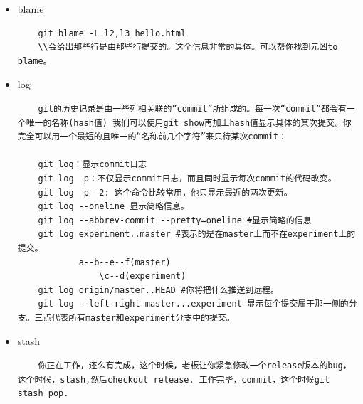 \documentclass[a4paper,12pt,twoside]{book}
\begin{document}
\begin{CJK*}{UTF8}{song}
\begin{itemize}
\begin{verbatim}
    ^ commit对象的第一个父母
    HEAD^^：表示HEAD父母的父母的信息
    HEAD^1：表示HEAD的第一个父母的信息
    HEAD^2：表示HEAD的第二个父母的信息

    ~n commit对象的上溯n代的父母
    HEAD~4：表示HEAD上溯四代的信息，~加数字。

    HEAD:README.txt 代表一个blob对象了。(blob对象的sh-hash值一般看不到，也不方便引用)

    :/fix a bug #代表在commit message 中查找fix a bug有这个串的第一个commit

    @{date specification}
    HEAD@{yesterday}

    git log 后面跟随一个命令集，命名一个集合可以采用一些简写。
    1)B...C #the set of commits that are reachable from either one of r1 or r2 but not from both.
    2)^G D #D的所有父母（包括D），但是不包括G的这个分支。
    3)D F #D,F的所有父母（包括D,F）
    4)C^@ #C的所有父母（不包括C）
    5)
    详细的信息，可以进一步参考gitrevisions命令
    \end{verbatim}

\item blame
    \begin{verbatim}
    git blame -L l2,l3 hello.html
    \\会给出那些行是由那些行提交的。这个信息非常的具体。可以帮你找到元凶to blame。
    \end{verbatim}

\item log
    \begin{verbatim}
    git的历史记录是由一些列相关联的”commit”所组成的。每一次“commit”都会有一个唯一的名称(hash值) 我们可以使用git show再加上hash值显示具体的某次提交。你完全可以用一个最短的且唯一的“名称前几个字符”来只待某次commit：

    git log：显示commit日志
    git log -p：不仅显示commit日志，而且同时显示每次commit的代码改变。
    git log -p -2: 这个命令比较常用，他只显示最近的两次更新。
    git log --oneline 显示简略信息。
    git log --abbrev-commit --pretty=oneline #显示简略的信息
    git log experiment..master #表示的是在master上而不在experiment上的提交。
            a--b--e--f(master)
                \c--d(experiment)
    git log origin/master..HEAD #你将把什么推送到远程。
    git log --left-right master...experiment 显示每个提交属于那一侧的分支。三点代表所有master和experiment分支中的提交。
    \end{verbatim}
\item stash
    \begin{verbatim}
    你正在工作，还么有完成，这个时候，老板让你紧急修改一个release版本的bug，这个时候，stash,然后checkout release. 工作完毕，commit，这个时候git stash pop.


\end{verbatim}
\end{itemize}
\end{CJK*}
\end{document}
